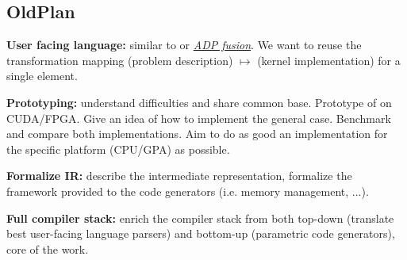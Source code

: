 \documentclass[11pt]{article}
\begin{document}
\subsection*{OldPlan} \ol
\item \textbf{User facing language:} similar to \cite{adp_gpu} or \cite{adp_fusion} \href{http://hackage.haskell.org/package/ADPfusion}{\it ADP fusion}. We want to reuse the transformation mapping (problem description) $\mapsto$ (kernel implementation) for a single element.
\item \textbf{Prototyping:} understand difficulties and share common base. Prototype of  on CUDA/FPGA. Give an idea of how to implement the general case. Benchmark and compare both implementations. Aim to do as good an implementation for the specific platform (CPU/GPA) as possible.
\item \textbf{Formalize IR:} describe the intermediate representation, formalize the framework provided to the code generators (i.e. memory management, ...).
\item \textbf{Full compiler stack:} enrich the compiler stack from both top-down (translate best user-facing language parsers) and bottom-up (parametric code generators), core of the work.
\ole
\end{document}

